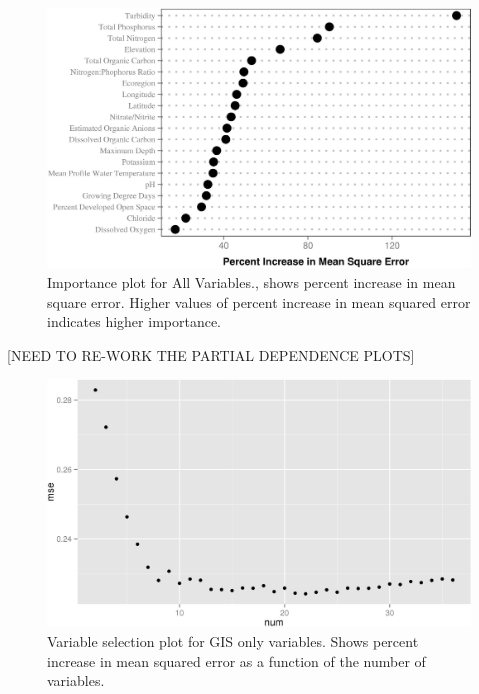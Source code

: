 \documentclass[11pt,]{article}
\begin{document}
\begin{figure}[htbp]
\centering
\includegraphics{manuscript_files/figure-latex/All_Importance-1.jpeg}
\caption{Importance plot for All Variables., shows percent increase in
mean square error. Higher values of percent increase in mean squared
error indicates higher importance. \label{fig:All_Importance}}
\end{figure}

\newpage

{[}NEED TO RE-WORK THE PARTIAL DEPENDENCE PLOTS{]}

\newpage

\begin{figure}[htbp]
\centering
\includegraphics{manuscript_files/figure-latex/gis_var_sel_figure-1.jpeg}
\caption{Variable selection plot for GIS only variables. Shows percent
increase in mean squared error as a function of the number of variables.
\label{fig:gis_varsel_figure}}
\end{figure}

\newpage
\end{document}
